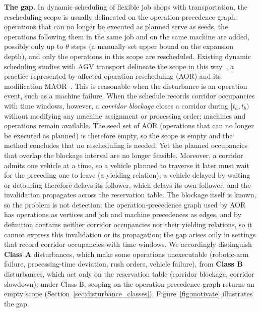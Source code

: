 \documentclass[manuscript,screen,review]{acmart}
\begin{document}
\textbf{The gap.}
In dynamic scheduling of flexible job shops with transportation, the rescheduling scope is usually delineated on the operation-precedence graph:
operations that can no longer be executed as planned serve as seeds, the operations following them in the same job and on the same machine are added, possibly only up to \(\theta\) steps (a manually set upper bound on the expansion depth),
and only the operations in this scope are rescheduled.
Existing dynamic scheduling studies with AGV transport delineate the scope in this way~\cite{zhang2023energy,tang2026dynamic}, a practice represented by affected-operation rescheduling (AOR) and its modification MAOR~\cite{subramaniam2003maor}.
This is reasonable when the disturbance is an operation event, such as a machine failure.
When the schedule records corridor occupancies with time windows, however, a \emph{corridor blockage} closes a corridor during \([t_a,t_b)\) without modifying any machine assignment or processing order; machines and operations remain available.
The seed set of AOR (operations that can no longer be executed as planned) is therefore empty, so the scope is empty and the method concludes that no rescheduling is needed.
Yet the planned occupancies that overlap the blockage interval are no longer feasible.
Moreover, a corridor admits one vehicle at a time, so a vehicle planned to traverse it later must wait for the preceding one to leave (a yielding relation); a vehicle delayed by waiting or detouring therefore delays its follower, which delays its own follower, and the invalidation propagates across the reservation table.
The blockage itself is known, so the problem is not detection: the operation-precedence graph used by AOR has operations as vertices and job and machine precedences as edges,
and by definition contains neither corridor occupancies nor their yielding relations, so it cannot express this invalidation or its propagation;
the gap arises only in settings that record corridor occupancies with time windows.
We accordingly distinguish \textbf{Class A} disturbances, which make some operations unexecutable (robotic-arm failure, processing-time deviation, rush orders, vehicle failure),
from \textbf{Class B} disturbances, which act only on the reservation table (corridor blockage, corridor slowdown); under Class B, scoping on the operation-precedence graph returns an empty scope (Section~\ref{sec:disturbance_classes}).
Figure~\ref{fig:motivate} illustrates the gap.
\end{document}
